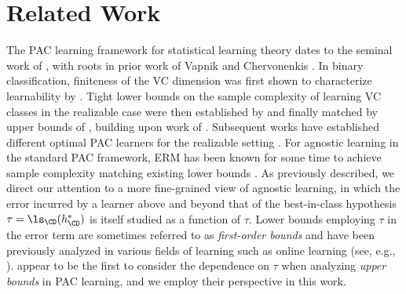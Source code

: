 \section{Related Work}
The PAC learning framework for statistical learning theory dates to the seminal work of \citet{valiant1984theory}, with roots in prior work of Vapnik and Chervonenkis \citep{vapnik1964class, vapnik1974theory}. In binary classification, finiteness of the VC dimension was first shown to characterize learnability by \citet{blumer1989learnability}. Tight lower bounds on the sample complexity of learning VC classes in the realizable case were then established by \citet{ehrenfeucht1989general} and finally matched by upper bounds of \citet{hanneke2016optimal}, building upon  work of \citet{simon2015almost}. Subsequent works have established different optimal PAC learners for the realizable setting \citet{aden2023optimal, baggingoptimal,aden2024majority}.
For agnostic learning in the standard PAC framework, ERM has been known for some time to achieve sample complexity matching existing lower bounds \citep{haussler1992decision, boucheron2005theory, anthony2009neural}. As previously described, we direct our attention to a more fine-grained view of agnostic learning, in which the error incurred by a learner above and beyond that of the best-in-class hypothesis $\tau = \ls_\CD(h^*_\CD)$ is itself studied as a function of $\tau$. Lower bounds employing $\tau$ in the error term are sometimes referred to as \emph{first-order bounds} and have been previously analyzed in various fields of learning such as online learning (see, e.g., \citet{wagenmaker2022first}). \citet{hanneke2024revisiting} appear to be the first to consider the dependence on $\tau$ when analyzing \emph{upper bounds} in PAC learning, and we employ their perspective in this work.